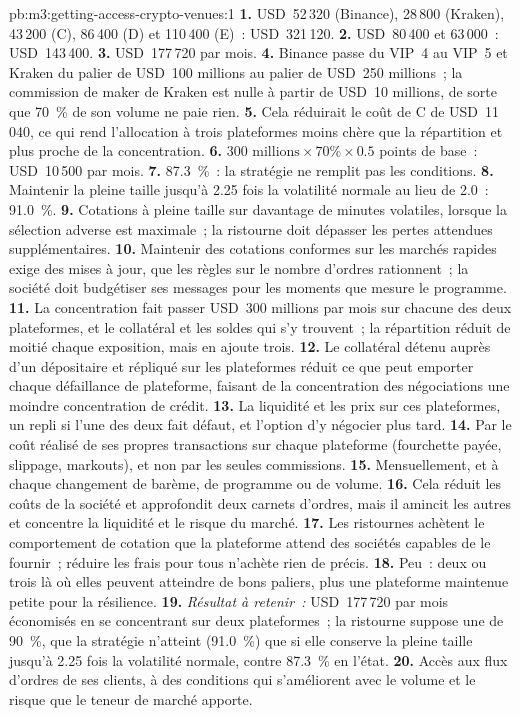 \begin{solution}{pb:m3:getting-access-crypto-venues:1}
\textbf{1.} USD~52\,320 (Binance), 28\,800 (Kraken), 43\,200 (C), 86\,400 (D) et 110\,400 (E)~: USD~321\,120. \textbf{2.} USD~80\,400 et
63\,000~: USD~143\,400. \textbf{3.} USD~177\,720 par mois. \textbf{4.} Binance passe du VIP~4 au VIP~5 et Kraken du palier de USD~100 millions au
palier de USD~250 millions~; la commission de maker de Kraken est nulle à partir de USD~10 millions, de sorte que 70~\% de son volume ne paie rien. \textbf{5.} Cela réduirait le coût de C de
USD~11\,040, ce qui rend l'allocation à trois plateformes moins chère que la répartition et plus proche de la concentration. \textbf{6.} $300\text{ millions} \times 70\% \times
0.5$ points de base~: USD~10\,500 par mois. \textbf{7.} 87.3~\%~: la stratégie ne remplit pas les conditions. \textbf{8.} Maintenir la pleine taille jusqu'à 2.25 fois la volatilité normale
au lieu de 2.0~: 91.0~\%. \textbf{9.} Cotations à pleine taille sur davantage de minutes volatiles, lorsque la sélection adverse est maximale~; la ristourne doit dépasser les
pertes attendues supplémentaires. \textbf{10.} Maintenir des cotations conformes sur les marchés rapides exige des mises à jour, que les règles sur le nombre d'ordres rationnent~; la société doit budgétiser
ses messages pour les moments que mesure le programme. \textbf{11.} La concentration fait passer USD~300 millions par mois sur chacune des deux plateformes, et
le collatéral et les soldes qui s'y trouvent~; la répartition réduit de moitié chaque exposition, mais en ajoute trois. \textbf{12.} Le collatéral détenu auprès d'un dépositaire et répliqué sur les plateformes
réduit ce que peut emporter chaque défaillance de plateforme, faisant de la concentration des négociations une moindre concentration de crédit. \textbf{13.} La liquidité et les prix sur
ces plateformes, un repli si l'une des deux fait défaut, et l'option d'y négocier plus tard. \textbf{14.} Par le coût réalisé de ses propres transactions sur chaque plateforme
(fourchette payée, slippage, markouts), et non par les seules commissions. \textbf{15.} Mensuellement, et à chaque changement de barème, de programme ou de volume. \textbf{16.}
Cela réduit les coûts de la société et approfondit deux carnets d'ordres, mais il amincit les autres et concentre la liquidité et le risque du marché. \textbf{17.} Les ristournes achètent
le comportement de cotation que la plateforme attend des sociétés capables de le fournir~; réduire les frais pour tous n'achète rien de précis. \textbf{18.} Peu~: deux ou
trois là où elles peuvent atteindre de bons paliers, plus une plateforme maintenue petite pour la résilience. \textbf{19.} \emph{Résultat à retenir~:} USD~177\,720 par mois économisés en se concentrant
sur deux plateformes~; la ristourne suppose une  de 90~\%, que la stratégie n'atteint (91.0~\%) que si elle conserve la pleine taille jusqu'à 2.25 fois la volatilité normale,
contre 87.3~\% en l'état. \textbf{20.} Accès aux flux d'ordres de ses clients, à des conditions qui s'améliorent avec le volume et le risque que le teneur de marché apporte.
\end{solution}

